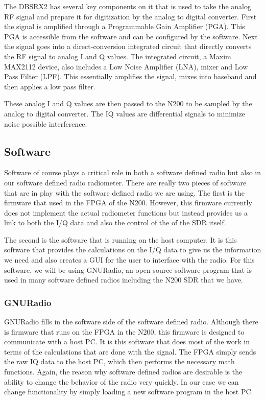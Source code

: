 The DBSRX2 has several key components on it that is used to take the analog RF signal and prepare it for digitization by the analog to digital converter.  First the signal is amplified through a Programmable Gain Amplifier (PGA).  This PGA is accessible from the software and can be configured by the software.  Next the signal goes into a direct-conversion integrated circuit that directly converts the RF signal to analog I and Q values.  The integrated circuit, a Maxim MAX2112 device, also includes a Low Noise Amplifier (LNA), mixer and Low Pass Filter (LPF).  This essentially amplifies the signal, mixes into baseband and then applies a low pass filter.  

These analog I and Q values are then passed to the N200 to be sampled by the analog to digital converter.  The IQ values are differential signals to minimize noise possible interference.

\subsection{Software}
Software of course plays a critical role in both a software defined radio but also in our software defined radio radiometer.  There are really two pieces of software that are in play with the software defined radio we are using.  The first is the firmware that used in the FPGA of the N200.  However, this firmware currently does not implement the actual radiometer functions but instead provides us a link to both the I/Q data and also the control of the of the SDR itself.  

The second is the software that is running on the host computer.  It is this software that provides the calculations on the I/Q data to give us the information we need and also creates a GUI for the user to interface with the radio.  For this software, we will be using GNURadio, an open source software program that is used in many software defined radios including the N200 SDR that we have.

\subsubsection{GNURadio}

GNURadio fills in the software side of the software defined radio.  Although there is firmware that runs on the FPGA in the N200, this firmware is designed to communicate with a host PC.  It is this software that does most of the work in terms of the calculations that are done with the signal.  The FPGA simply sends the raw IQ data to the host PC, which then performs the necessary math functions.  Again, the reason why software defined radios are desirable is the ability to change the behavior of the radio very quickly.  In our case we can change functionality by simply loading a new software program in the host PC.  

